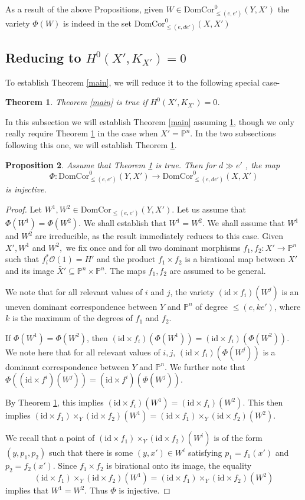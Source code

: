 \documentclass[12pt]{amsart}
\numberwithin{equation}{section}
\newtheorem{theorem}{Theorem}
\newtheorem{proposition}[theorem]{Proposition}
\numberwithin{theorem}{section}
\theoremstyle{definition}
\theoremstyle{definition}
\def\PP{{\mathbb{P}}}
\def\id{{\mathrm{id}}}
\def \DC{{\mathrm{DomCor}}}
\newcommand{\OO}{\mathcal{O}}
\begin{document}
As a result of the above Propositions, given $W \in \DC^0_{\le(e,e')} (Y,X')$ the variety $\Phi(W)$ is indeed in the set $\DC^0_{\le(e,de')}(X, X')$

\subsection{Reducing to $H^0(X', K_{X'}) =0$}

To establish Theorem \ref{main}, we will reduce it to the following special case-
\begin{theorem}\label{mainspecialcase}
    Theorem \ref{main} is true if $H^0(X',  K_{X'}) =0$.
\end{theorem}
In this subsection we will establish Theorem \ref{main} assuming \ref{mainspecialcase}, though we only really require Theorem \ref{mainspecialcase} in the case when $X' = \PP^n$. In the  two subsections following this one, we will establish Theorem \ref{mainspecialcase}.

\begin{proposition}\label{redpn}
 Assume that Theorem \ref{mainspecialcase} is true. Then for $d \gg e'$ ,
the map $$\Phi: \DC^0_{\le (e,e')} (Y,X') \to \DC^0_{\le (e,de')} (X,X')$$ is injective.  
\end{proposition}
\begin{proof}
    Let $W^1, W^2 \in \DC_{\le(e,e')} (Y, X')$. Let us assume that $\Phi(W^1) = \Phi(W^2).$ We shall establish that $W^1 = W^2.$ We shall assume that $W^1$ and $W^2$ are irreducible, as the result immediately reduces to this case.
    Given $X', W^1$ and $ W^2,$ we fix once and for all two dominant morphisms $f_1, f_2: X' \to \PP^n$ such that $f_i^* \OO(1) = H'$ and  the product $f_1 \times f_2$ is a birational map between $X'$ and its image $\bar X' \subseteq \PP^n \times \PP^n$. The maps  $f_1, f_2$ are assumed to be general.
    
    We note that for all relevant values of $i$ and $j$,  the variety $(\id \times f_i)(W^j)$ is an uneven dominant correspondence between $Y$ and $\PP^n$ of degree $\le (e, k e')$, where $k$ is the maximum of the degrees of  $f_1$  and $f_2$.
    
    If $\Phi(W^1) = \Phi(W^2)$, then $(\id \times f_i)(\Phi(W^1)) = (\id \times f_i)(\Phi(W^2))$. We note here that for all relevant values of $i,j$, $(\id \times f_i)(\Phi(W^j))$ is a dominant correspondence between $Y$ and $\PP^n$. We further note that $\Phi((\id \times f^i) (W^j)) = (\id \times f^i)(\Phi(W^j)).$
    
    By Theorem \ref{mainspecialcase}, this implies $(\id \times f_i)(W^1) = (\id \times f_i)(W^2)$. This then implies $(\id \times f_1) \times_Y (\id \times f_2)(W^1) = (\id \times f_1) \times_Y (\id \times f_2)(W^2)$.
    
    We recall that a point of $(\id \times f_1) \times_Y (\id \times f_2)(W^i)$ is of the form $(y, p_1, p_2)$ such that there is some $(y, x') \in W^i$ satisfying $p_1 = f_1(x')$ and $p_2= f_2(x').$ Since $f_1 \times f_2$ is birational onto its image, the equality $$(\id \times f_1) \times_Y (\id \times f_2)(W^1) = (\id \times f_1) \times_Y (\id \times f_2)(W^2)$$ implies that  $W^1 = W^2$. Thus $\Phi$ is injective.
\end{proof}
\end{document}
